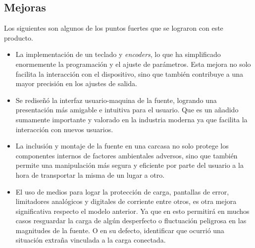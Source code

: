\subsection{Mejoras} 
Los siguientes son algunos de los puntos fuertes que se lograron con este producto.  
\begin{itemize}
    \item La implementación de un teclado y \textit{encoders}, lo que ha simplificado enormemente la programación y el ajuste de parámetros. Esta mejora no solo facilita la interacción con el dispositivo, sino que también contribuye a una mayor precisión en los ajustes de salida. \par
    \item Se rediseñó la interfaz usuario-maquina de la fuente, logrando una presentación más amigable e intuitiva para el usuario. Que es un añadido sumamente importante y valorado en la industria moderna ya que facilita la interacción con nuevos usuarios. \par 
    \item La inclusión y montaje de la fuente en una carcasa no solo protege los componentes internos de factores ambientales adversos, sino que también permite una manipulación más segura y eficiente por parte del usuario a la hora de transportar la misma de un lugar a otro.\par
    \item El uso de medios para logar la protección de carga, pantallas de error, limitadores analógicos y digitales de corriente entre otros, es otra mejora significativa respecto el modelo anterior. Ya que en esto permitirá en muchos casos resguardar la carga de algún desperfecto o fluctuación peligrosa en las magnitudes de la fuente. O en su defecto, identificar que ocurrió una situación extraña vinculada a la carga conectada.   
\end{itemize}

